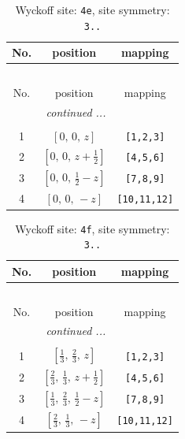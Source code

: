 \documentclass[fleqn,8pt]{jsarticle}
\begin{document}
\begin{longtable}{ccc}
\caption{Wyckoff site: {\tt 4e}, site symmetry: {\tt 3..}}
 \\
 \hline \hline
No. & position & mapping \\ \hline \endfirsthead

\multicolumn{2}{l}{\tablename\ \thetable{}} \\
 \hline \hline
No. & position & mapping \\ \hline \endhead

 \hline \hline
\multicolumn{2}{r}{\footnotesize\it continued ...} \\ \endfoot

 \hline \hline
\multicolumn{2}{r}{} \\ \endlastfoot

1 & $\left[ 0,\, 0,\, z \right]$ & {\tt [1,2,3]} \\ \hline
2 & $\left[ 0,\, 0,\, z + \frac{1}{2} \right]$ & {\tt [4,5,6]} \\ \hline
3 & $\left[ 0,\, 0,\, \frac{1}{2} - z \right]$ & {\tt [7,8,9]} \\ \hline
4 & $\left[ 0,\, 0,\, - z \right]$ & {\tt [10,11,12]} \\
\end{longtable}
\renewcommand{\arraystretch}{1.2}
\begin{longtable}{ccc}
\caption{Wyckoff site: {\tt 4f}, site symmetry: {\tt 3..}}
 \\
 \hline \hline
No. & position & mapping \\ \hline \endfirsthead

\multicolumn{2}{l}{\tablename\ \thetable{}} \\
 \hline \hline
No. & position & mapping \\ \hline \endhead

 \hline \hline
\multicolumn{2}{r}{\footnotesize\it continued ...} \\ \endfoot

 \hline \hline
\multicolumn{2}{r}{} \\ \endlastfoot

1 & $\left[ \frac{1}{3},\, \frac{2}{3},\, z \right]$ & {\tt [1,2,3]} \\ \hline
2 & $\left[ \frac{2}{3},\, \frac{1}{3},\, z + \frac{1}{2} \right]$ & {\tt [4,5,6]} \\ \hline
3 & $\left[ \frac{1}{3},\, \frac{2}{3},\, \frac{1}{2} - z \right]$ & {\tt [7,8,9]} \\ \hline
4 & $\left[ \frac{2}{3},\, \frac{1}{3},\, - z \right]$ & {\tt [10,11,12]} \\
\end{longtable}
\end{document}
